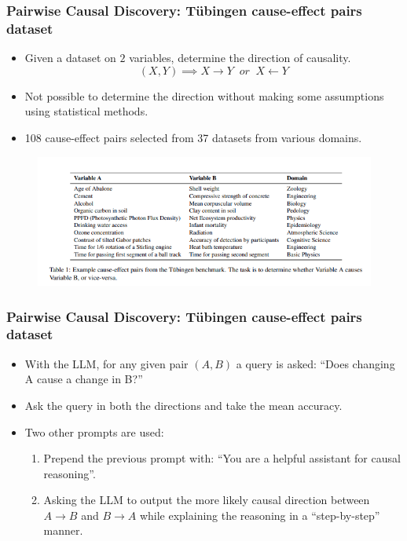 \documentclass{beamer}
\begin{document}
\begin{frame}
	\frametitle{Pairwise Causal Discovery: T\"{u}bingen cause-effect pairs dataset}
	\begin{itemize}
		\item Given a dataset on $ 2 $ variables, determine the direction of causality.
			$$ (X, Y) \implies X \rightarrow Y \;\; \textit{or} \; \; X \leftarrow Y $$
		\item Not possible to determine the direction without making some assumptions using statistical methods.
		\item 108 cause-effect pairs selected from 37 datasets from
			various domains.
	\end{itemize}
	\begin{figure}
		\centering
		\includegraphics[scale=0.5]{imgs/table1.png}
	\end{figure}
\end{frame}

\begin{frame}
	\frametitle{Pairwise Causal Discovery: T\"{u}bingen cause-effect pairs dataset}
	\begin{itemize}
		\item With the LLM, for any given pair $ (A, B) $ a query is asked: ``Does changing A cause a change in B?''
		\item Ask the query in both the directions and take the mean accuracy.
		\item Two other prompts are used:
			\begin{enumerate}
				\item Prepend the previous prompt with: ``You are a helpful assistant for causal reasoning''.
				\item Asking the LLM to output the more likely causal direction between $ A \rightarrow B $ and $ B \rightarrow A $ while
					explaining the reasoning in a ``step-by-step'' manner.
			\end{enumerate}
	\end{itemize}
\end{frame}
\end{document}
